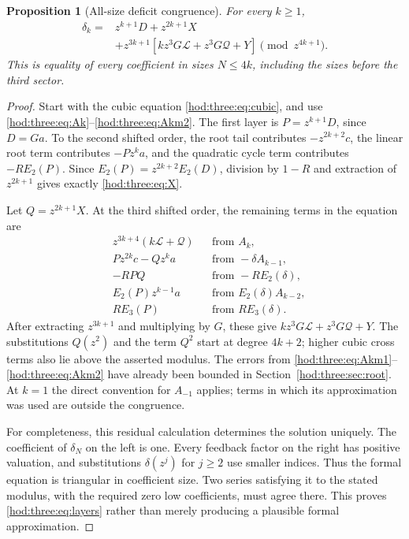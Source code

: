\documentclass[11pt,letterpaper]{article}
\newtheorem{proposition}[theorem]{Proposition}
\theoremstyle{definition}\newtheorem{definition}[theorem]{Definition}
\theoremstyle{remark}\newtheorem{remark}[theorem]{Remark}
\newcommand{\Lcal}{\mathcal L}
\newcommand{\Qcal}{\mathcal Q}
\begin{document}
\begin{proposition}[All-size deficit congruence]\label{hod:three:prop:deficit}
For every $k\ge1$,
\begin{equation}\label{hod:three:eq:layers}
\begin{split}
\delta_k={}&z^{k+1}D+z^{2k+1}X\\
&+z^{3k+1}\left[kz^3G\Lcal+z^3G\Qcal+Y\right]
\pmod {z^{4k+1}}.
\end{split}
\end{equation}
This is equality of \emph{every} coefficient in sizes $N\le4k$, including the sizes before the third sector.
\end{proposition}
\begin{proof}
Start with the cubic equation \eqref{hod:three:eq:cubic}, and use \eqref{hod:three:eq:Ak}--\eqref{hod:three:eq:Akm2}. The first layer is $P=z^{k+1}D$, since $D=Ga$. To the second shifted order, the root tail contributes $-z^{2k+2}c$, the linear root term contributes $-Pz^ka$, and the quadratic cycle term contributes $-R E_2(P)$. Since $E_2(P)=z^{2k+2}E_2(D)$, division by $1-R$ and extraction of $z^{2k+1}$ gives exactly \eqref{hod:three:eq:X}.

Let $Q=z^{2k+1}X$. At the third shifted order, the remaining terms in the equation are
\begin{align*}
&z^{3k+4}(k\Lcal+\Qcal) &&\text{from }A_k,\\
&Pz^{2k}c-Qz^ka &&\text{from }-\delta A_{k-1},\\
&-RPQ &&\text{from }-R E_2(\delta),\\
&E_2(P)z^{k-1}a &&\text{from }E_2(\delta)A_{k-2},\\
&R E_3(P) &&\text{from }R E_3(\delta).
\end{align*}
After extracting $z^{3k+1}$ and multiplying by $G$, these give $kz^3G\Lcal+z^3G\Qcal+Y$. The substitutions $Q(z^2)$ and the term $Q^2$ start at degree $4k+2$; higher cubic cross terms also lie above the asserted modulus. The errors from \eqref{hod:three:eq:Akm1}--\eqref{hod:three:eq:Akm2} have already been bounded in Section~\ref{hod:three:sec:root}. At $k=1$ the direct convention for $A_{-1}$ applies; terms in which its approximation was used are outside the congruence.

For completeness, this residual calculation determines the solution uniquely. The coefficient of $\delta_N$ on the left is one. Every feedback factor on the right has positive valuation, and substitutions $\delta(z^j)$ for $j\ge2$ use smaller indices. Thus the formal equation is triangular in coefficient size. Two series satisfying it to the stated modulus, with the required zero low coefficients, must agree there. This proves \eqref{hod:three:eq:layers} rather than merely producing a plausible formal approximation.
\end{proof}
\end{document}
